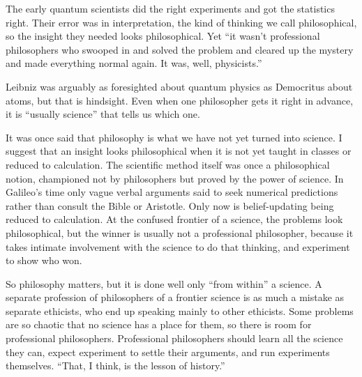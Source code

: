 The early quantum scientists did the right experiments and got the statistics right. Their error was in interpretation, the kind of thinking we call philosophical, so the insight they needed looks philosophical. Yet ``it wasn't professional philosophers who swooped in and solved the problem and cleared up the mystery and made everything normal again. It was, well, physicists.'' 

Leibniz was arguably as foresighted about quantum physics as Democritus about atoms, but that is hindsight. Even when one philosopher gets it right in advance, it is ``usually science'' that tells us which one. 

It was once said that philosophy is what we have not yet turned into science.  I suggest that an insight looks philosophical when it is not yet taught in classes or reduced to calculation. The scientific method itself was once a philosophical notion, championed not by philosophers but proved by the power of science. In Galileo's time only vague verbal arguments said to seek numerical predictions rather than consult the Bible or Aristotle. Only now is belief-updating being reduced to calculation. At the confused frontier of a science, the problems look philosophical, but the winner is usually not a professional philosopher, because it takes intimate involvement with the science to do that thinking, and experiment to show who won.

So philosophy matters, but it is done well only ``from within'' a science. A separate profession of philosophers of a frontier science is as much a mistake as separate ethicists, who end up speaking mainly to other ethicists. Some problems are so chaotic that no science has a place for them, so there is room for professional philosophers. Professional philosophers should learn all the science they can, expect experiment to settle their arguments, and run experiments themselves. ``That, I think, is the lesson of history.''
